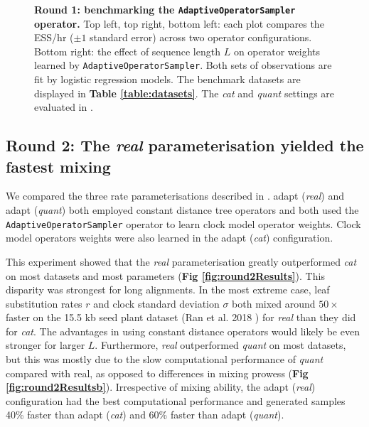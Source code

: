 \documentclass[10pt,letterpaper]{article}
\begin{document}
\begin{figure}[!h]
\caption{\textbf{Round 1: benchmarking the \texttt{AdaptiveOperatorSampler} operator.} Top left, top right, bottom left: each plot compares the ESS/hr ($\pm 1$ standard error) across two operator configurations.
Bottom right: the effect of sequence length $L$ on operator weights learned by \texttt{AdaptiveOperatorSampler}. Both sets of observations are fit by logistic regression models.
 The benchmark datasets are displayed in \textbf{Table \ref{table:datasets}}. The \emph{cat} and \emph{quant} settings are evaluated in \textbf{}.  }
\label{fig:round1Results}
\end{figure}








\clearpage
\subsection*{Round 2: The \textit{real} parameterisation yielded the fastest mixing }

We compared the three rate parameterisations described in \textbf{}. 
adapt (\textit{real}) and adapt (\textit{quant}) both employed constant distance tree operators \cite{zhang2020improving} and both used the \texttt{AdaptiveOperatorSampler} operator to learn clock model operator weights.
Clock model operators weights were also learned in the adapt (\textit{cat}) configuration.




This experiment showed that the \textit{real} parameterisation greatly outperformed \textit{cat} on most datasets and most parameters (\textbf{Fig \ref{fig:round2Results}}).
This disparity was strongest for long alignments.
In the most extreme case, leaf substitution rates $r$ and clock standard deviation $\sigma$ both mixed around $50\times$ faster on the 15.5 kb seed plant dataset (Ran et al. 2018 \cite{Ran_2018}) for \textit{real} than they did for \textit{cat}.
The advantages in using constant distance operators would likely be even stronger for larger $L$.
Furthermore, \textit{real} outperformed \textit{quant} on most datasets, but this was mostly due to the slow computational performance of \textit{quant} compared with real, as opposed to differences in mixing prowess (\textbf{Fig \ref{fig:round2Resultsb}}).
Irrespective of mixing ability, the adapt (\textit{real}) configuration had the best computational performance and generated samples 40\% faster than adapt (\textit{cat}) and 60\% faster than adapt (\textit{quant}).
\end{document}
